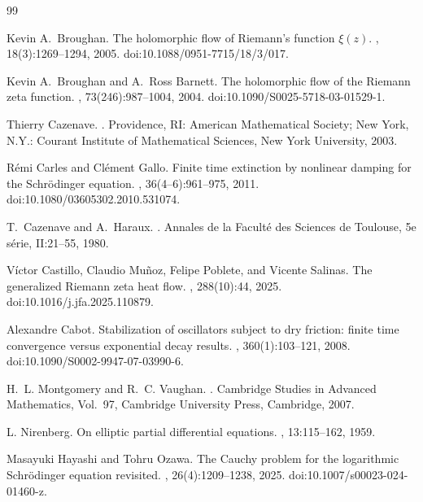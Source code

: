 \documentclass[10pt]{article}
\begin{document}
\begin{thebibliography}{99}

Kevin A.~Broughan.
\newblock The holomorphic flow of Riemann's function $\xi(z)$.
, 18(3):1269--1294, 2005.
\newblock doi:10.1088/0951-7715/18/3/017.

Kevin A.~Broughan and A.~Ross Barnett.
\newblock The holomorphic flow of the Riemann zeta function.
, 73(246):987--1004, 2004.
\newblock doi:10.1090/S0025-5718-03-01529-1.

Thierry Cazenave.
.
\newblock Providence, RI: American Mathematical Society; New York, N.Y.: Courant Institute of Mathematical Sciences, New York University, 2003.

R\'emi Carles and Cl\'ement Gallo.
\newblock Finite time extinction by nonlinear damping for the Schr\"odinger equation.
, 36(4--6):961--975, 2011.
\newblock doi:10.1080/03605302.2010.531074.

T.~Cazenave and A.~Haraux.
.
\newblock Annales de la Faculté des Sciences de Toulouse, 5e série, II:21--55, 1980.

V\'ictor Castillo, Claudio Mu\~noz, Felipe Poblete, and Vicente Salinas.
\newblock The generalized Riemann zeta heat flow.
, 288(10):44, 2025.
\newblock doi:10.1016/j.jfa.2025.110879.


Alexandre Cabot.
\newblock Stabilization of oscillators subject to dry friction: finite time convergence versus exponential decay results.
, 360(1):103--121, 2008.
\newblock doi:10.1090/S0002-9947-07-03990-6.

H.~L. Montgomery and R.~C. Vaughan.
.
\newblock Cambridge Studies in Advanced Mathematics, Vol.~97,
Cambridge University Press, Cambridge, 2007.

L. Nirenberg.
\newblock On elliptic partial differential equations.
, 13:115--162, 1959.

Masayuki Hayashi and Tohru Ozawa.
\newblock The Cauchy problem for the logarithmic Schr\"odinger equation revisited.
, 26(4):1209--1238, 2025.
\newblock doi:10.1007/s00023-024-01460-z.















\end{thebibliography}
\end{document}
